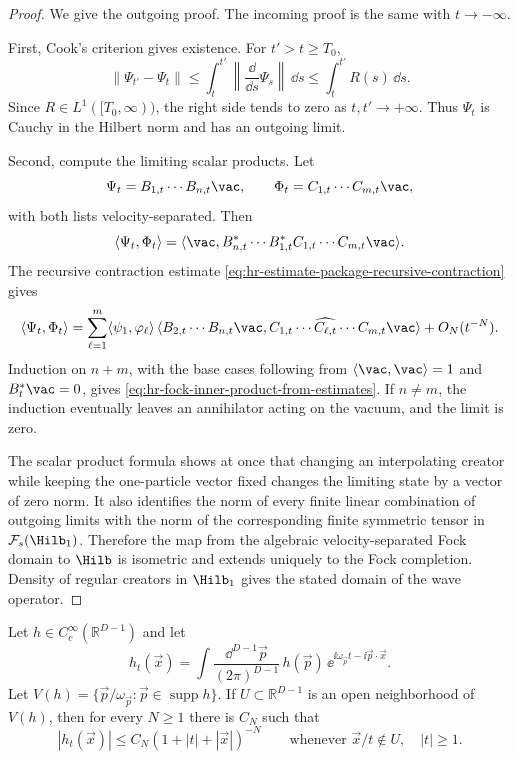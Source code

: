\begin{proof}
We give the outgoing proof.  The incoming proof is the same with
\(t\to-\infty\).

First, Cook's criterion gives existence.  For \(t'>t\ge T_0\),
\[
  \|\Psi_{t'}-\Psi_t\|
  \le
  \int_t^{t'}\left\|\frac{\dd}{\dd s}\Psi_s\right\|\,\dd s
  \le
  \int_t^{t'}R(s)\,\dd s .
\]
Since \(R\in L^1([T_0,\infty))\), the right side tends to zero as
\(t,t'\to+\infty\).  Thus \(\Psi_t\) is Cauchy in the Hilbert norm and has an
outgoing limit.

Second, compute the limiting scalar products.  Let
\[
  \Psi_t=B_{1,t}\cdots B_{n,t}\vac,
  \qquad
  \Phi_t=C_{1,t}\cdots C_{m,t}\vac ,
\]
with both lists velocity-separated.  Then
\[
  \langle\Psi_t,\Phi_t\rangle
  =
  \langle\vac,
  B_{n,t}^*\cdots B_{1,t}^*
  C_{1,t}\cdots C_{m,t}\vac\rangle .
\]
The recursive contraction estimate
\eqref{eq:hr-estimate-package-recursive-contraction} gives
\[
  \langle\Psi_t,\Phi_t\rangle
  =
  \sum_{\ell=1}^{m}
  \langle\psi_1,\varphi_\ell\rangle\,
  \langle
    B_{2,t}\cdots B_{n,t}\vac,
    C_{1,t}\cdots \widehat{C_{\ell,t}}\cdots C_{m,t}\vac
  \rangle
  +O_N(t^{-N}).
\]
Induction on \(n+m\), with the base cases following from
\(\langle\vac,\vac\rangle=1\) and \(B_t^*\vac=0\), gives
\eqref{eq:hr-fock-inner-product-from-estimates}.  If \(n\ne m\), the
induction eventually leaves an annihilator acting on the vacuum, and the
limit is zero.

The scalar product formula shows at once that changing an interpolating
creator while keeping the one-particle vector fixed changes the limiting
state by a vector of zero norm.  It also identifies the norm of every finite
linear combination of outgoing limits with the norm of the corresponding
finite symmetric tensor in \(\mathcal F_s(\Hilb_1)\).  Therefore the map from
the algebraic velocity-separated Fock domain to \(\Hilb\) is isometric and
extends uniquely to the Fock completion.  Density of regular creators in
\(\Hilb_1\) gives the stated domain of the wave operator.
\end{proof}

\begin{lemma}
\label{lem:hr-stationary-phase-velocity-localization}
Let \(h\in C_c^\infty(\mathbb R^{D-1})\) and let
\[
  h_t(\vec x)
  =
  \int\frac{\dd^{D-1}\vec p}{(2\pi)^{D-1}}\,
  h(\vec p)\,
  \ee^{\ii\omega_{\vec p}t-\ii\vec p\cdot\vec x}.
\]
Let \(V(h)=\{\vec p/\omega_{\vec p}:\vec p\in\operatorname{supp}h\}\).  If
\(U\subset\mathbb R^{D-1}\) is an open neighborhood of \(V(h)\), then for
every \(N\ge1\) there is \(C_N\) such that
\[
  |h_t(\vec x)|\le C_N(1+|t|+|\vec x|)^{-N}
  \qquad
  \text{whenever }\vec x/t\notin U,\quad |t|\ge1 .
\]
\end{lemma}

